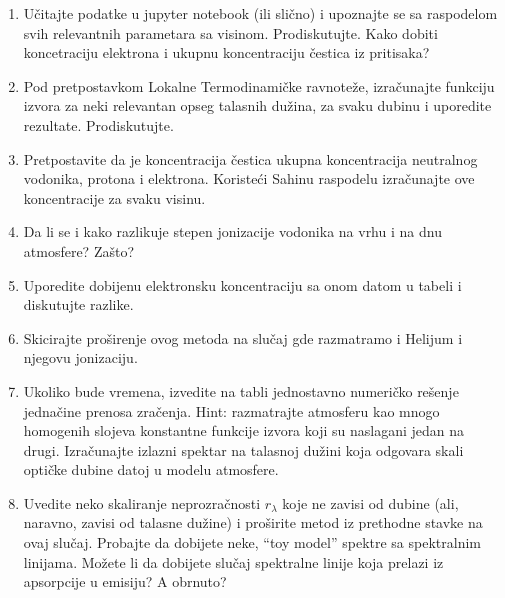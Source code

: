 \documentclass[12pt]{article}
\begin{document}
\begin{enumerate}
    \item U\v{c}itajte podatke u jupyter notebook (ili sli\v{c}no) i upoznajte se sa raspodelom svih relevantnih parametara sa visinom. Prodiskutujte. Kako dobiti koncetraciju elektrona i ukupnu koncentraciju \v{c}estica iz pritisaka?
    \item Pod pretpostavkom Lokalne Termodinami\v{c}ke ravnote\v{z}e, izra\v{c}unajte funkciju izvora za neki relevantan opseg talasnih du\v{z}ina, za svaku dubinu i uporedite rezultate. Prodiskutujte. 
    \item Pretpostavite da je koncentracija \v{c}estica ukupna koncentracija neutralnog vodonika, protona i elektrona. Koriste\'{c}i Sahinu raspodelu izra\v{cunajte} ove koncentracije za svaku visinu. 
    \item Da li se i kako razlikuje stepen jonizacije vodonika na vrhu i na dnu atmosfere? Za\v{s}to?
    \item Uporedite dobijenu elektronsku koncentraciju sa onom datom u tabeli i diskutujte razlike. 
    \item Skicirajte pro\v{s}irenje ovog metoda na slu\v{c}aj gde razmatramo i Helijum i njegovu jonizaciju. \
    \item Ukoliko bude vremena, izvedite na tabli jednostavno numeri\v{c}ko re\v{s}enje jedna\v{c}ine prenosa zra\v{c}enja. Hint: razmatrajte atmosferu kao mnogo homogenih slojeva konstantne funkcije izvora koji su naslagani jedan na drugi. Izra\v{c}unajte izlazni spektar na talasnoj du\v{z}ini koja odgovara skali opti\v{c}ke dubine datoj u modelu atmosfere.
    \item Uvedite neko skaliranje neprozra\v{c}nosti $r_\lambda$ koje ne zavisi od dubine (ali, naravno, zavisi od talasne du\v{z}ine) i pro\v{s}irite metod iz prethodne stavke na ovaj slu\v{c}aj. Probajte da dobijete neke, ``toy model'' spektre sa spektralnim linijama. Mo\v{z}ete li da dobijete slu\v{c}aj spektralne linije koja prelazi iz apsorpcije u emisiju? A obrnuto?
\end{enumerate}
\end{document}
